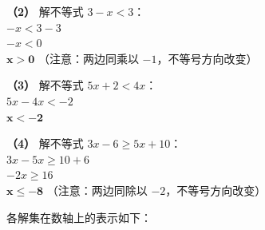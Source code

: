 \textbf{（2）} 解不等式 $3-x < 3$：\\
\hspace*{0.8cm} $-x < 3 - 3$\\
\hspace*{0.8cm} $-x < 0$\\
\hspace*{0.8cm} $\boldsymbol{x > 0}$ （注意：两边同乘以 $-1$，不等号方向改变）

\textbf{（3）} 解不等式 $5x+2 < 4x$：\\
\hspace*{0.8cm} $5x - 4x < -2$\\
\hspace*{0.8cm} $\boldsymbol{x < -2}$

\textbf{（4）} 解不等式 $3x-6 \geqslant 5x+10$：\\
\hspace*{0.8cm} $3x - 5x \geqslant 10 + 6$\\
\hspace*{0.8cm} $-2x \geqslant 16$\\
\hspace*{0.8cm} $\boldsymbol{x \leqslant -8}$ （注意：两边同除以 $-2$，不等号方向改变）

\vspace{0.4cm}
各解集在数轴上的表示如下：

\vspace{0.4cm}

